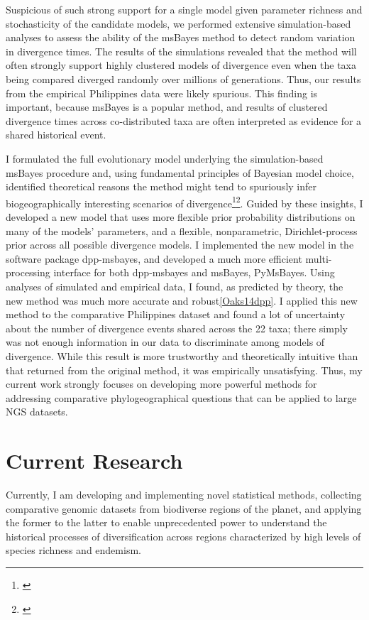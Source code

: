 Suspicious of such strong support for a single model given parameter richness
and stochasticity of the candidate models,
we performed extensive simulation-based analyses to assess the ability of the
msBayes method to detect random variation in divergence times.
The results of the simulations revealed that the method will often strongly
support highly clustered models of divergence even when the taxa being compared
diverged randomly over millions of generations.
Thus, our results from the empirical Philippines data were likely spurious.
This finding is important, because msBayes is a popular method, and results of
clustered divergence times across co-distributed taxa are often interpreted as
evidence for a shared historical event.

I formulated the full evolutionary model underlying the simulation-based
msBayes procedure and, using fundamental principles of Bayesian model choice,
identified theoretical reasons the method might tend to spuriously infer
biogeographically interesting scenarios of
divergence\footnote{\label{Oaks12}}\super{,}\footnote{\label{Oaks14reply}}.
Guided by these insights, I developed a new model that uses more flexible prior
probability distributions on many of the models' parameters, and a flexible,
nonparametric, Dirichlet-process prior across all possible divergence models.
I implemented the new model in the software package dpp-msbayes, and developed
a much more efficient multi-processing interface for both dpp-msbayes and
msBayes, PyMsBayes.
Using analyses of simulated and empirical data, I found, as predicted by
theory, the new method was much more accurate and
robust\cref{Oaks14dpp}.
I applied this new method to the comparative Philippines dataset and found a
lot of uncertainty about the number of divergence events shared across the 22
taxa; there simply was not enough information in our data to discriminate among
models of divergence.
While this result is more trustworthy and theoretically intuitive than that
returned from the original method, it was empirically unsatisfying.
Thus, my current work strongly focuses on developing more powerful methods for
addressing comparative phylogeographical questions that can be applied to large
NGS datasets.


\section*{Current Research}
Currently, I am developing and implementing novel statistical methods,
collecting comparative genomic datasets from biodiverse regions of the planet,
and applying the former to the latter to enable unprecedented power to
understand the historical processes of diversification across regions
characterized by high levels of species richness and endemism.

